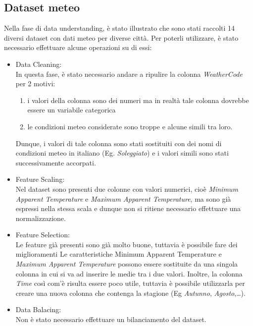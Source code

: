 \documentclass[a4paper, 11pt, oneside]{report}
\begin{document}
                \subsection{Dataset meteo}
                Nella fase di data understanding, è stato illustrato che sono stati raccolti 14 diversi dataset con dati meteo per diverse città.
                Per poterli utilizzare, è stato necessario effettuare alcune operazioni su di essi:\\
                \begin{itemize}
                    \item Data Cleaning:\\
                    In questa fase, è stato necessario andare a ripulire la colonna \emph{WeatherCode} per 2 motivi:
                        \begin{enumerate}
                            \item i valori della colonna sono dei numeri ma in realtà tale colonna dovrebbe essere un variabile categorica
                            \item le condizioni meteo considerate sono troppe e alcune simili tra loro.
                        \end{enumerate}
                    Dunque, i valori di tale colonna sono stati sostituiti con dei nomi di condizioni meteo in italiano (Eg.
                    \emph{Soleggiato}) e i valori simili sono stati successivamente accorpati.
                    \item Feature Scaling:\\
                    Nel dataset sono presenti due colonne con valori numerici, cioè
                    \emph{Minimum Apparent Temperature} e \emph{Maximum Apparent Temperature},
                    ma sono già espressi nella stessa scala e dunque non si ritiene necessario effettuare una normalizzazione.
                    \item Feature Selection:\\
                    Le feature già presenti sono già molto buone, tuttavia è possibile fare dei miglioramenti
                    Le caratteristiche {Minimum Apparent Temperature} e \emph{Maximum Apparent Temperature}
                    possono essere sostituite da una singola colonna in cui si va ad inserire le medie tra i due valori.
                    Inoltre, la colonna \emph{Time} così com'è risulta essere poco utile, tuttavia è possibile utilizzarla per
                    creare una nuova colonna che contenga la stagione (Eg \emph{Autunno}, \emph{Agosto},\ldots).
                    \item Data Balacing:\\
                    Non è stato necessario effettuare un bilanciamento del dataset.
                \end{itemize}
\end{document}
